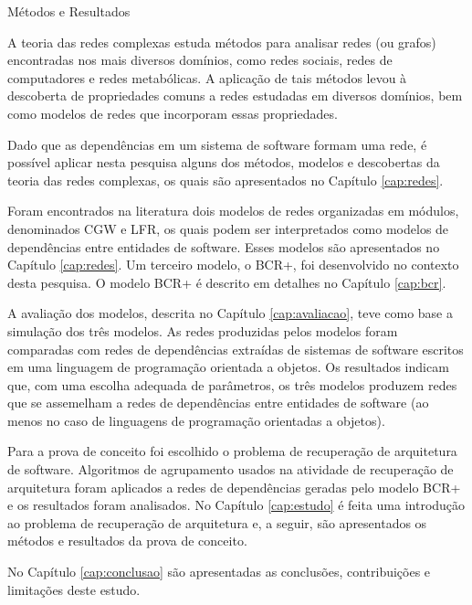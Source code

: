 \begin{section}{Métodos e Resultados}
	
	A teoria das redes complexas estuda métodos para analisar redes (ou grafos) encontradas nos mais diversos domínios, como redes sociais, redes de computadores e redes metabólicas. A aplicação de tais métodos levou à descoberta de propriedades comuns a redes estudadas em diversos domínios, bem como modelos de redes que incorporam essas propriedades.
	
	Dado que as dependências em um sistema de software formam uma rede, é possível aplicar nesta pesquisa alguns dos métodos, modelos e descobertas da teoria das redes complexas, os quais são apresentados no Capítulo \ref{cap:redes}.
	
	Foram encontrados na literatura dois modelos de redes organizadas em módulos, denominados CGW e LFR, os quais podem ser interpretados como modelos de dependências entre entidades de software. Esses modelos são apresentados no Capítulo \ref{cap:redes}. Um terceiro modelo, o BCR+, foi desenvolvido no contexto desta pesquisa. O modelo BCR+ é descrito em detalhes no Capítulo \ref{cap:bcr}.
	
	A avaliação dos modelos, descrita no Capítulo \ref{cap:avaliacao}, teve como base a simulação dos três modelos. As redes produzidas pelos modelos foram comparadas com redes de dependências extraídas de sistemas de software escritos em uma linguagem de programação orientada a objetos. Os resultados indicam que, com uma escolha adequada de parâmetros, os três modelos produzem redes que se assemelham a redes de dependências entre entidades de software (ao menos no caso de linguagens de programação orientadas a objetos).
	
	Para a prova de conceito foi escolhido o problema de recuperação de arquitetura de software. Algoritmos de agrupamento usados na atividade de recuperação de arquitetura foram aplicados a redes de dependências geradas pelo modelo BCR+ e os resultados foram analisados. No Capítulo \ref{cap:estudo} é feita uma introdução ao problema de recuperação de arquitetura e, a seguir, são apresentados os métodos e resultados da prova de conceito.
	
	No Capítulo \ref{cap:conclusao} são apresentadas as conclusões, contribuições e limitações deste estudo.
	
	
\end{section}
